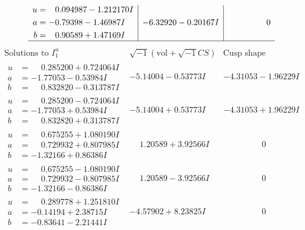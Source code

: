 \documentclass[1p]{elsarticle_modified}
\theoremstyle{definition}
\newcommand{\I}{\sqrt{-1}}
\begin{document}
$$\begin{array}{c|c|c}
\begin{aligned}
u &= \phantom{-}0.094987 - 1.212170 I \\
a &= -0.79398 - 1.46987 I \\
b &= \phantom{-}0.90589 + 1.47169 I\end{aligned}
 & -6.32920 - 0.20167 I & \phantom{-0.000000 } 0\\
 \hline 
 \end{array}$$\newpage$$\begin{array}{c|c|c}  
\text{Solutions to }I^u_{1}& \I (\text{vol} + \sqrt{-1}CS) & \text{Cusp shape}\\
 \hline 
\begin{aligned}
u &= \phantom{-}0.285200 + 0.724064 I \\
a &= -1.77053 - 0.53984 I \\
b &= \phantom{-}0.832820 - 0.313787 I\end{aligned}
 & -5.14004 - 0.53773 I & -4.31053 - 1.96229 I \\ \hline\begin{aligned}
u &= \phantom{-}0.285200 - 0.724064 I \\
a &= -1.77053 + 0.53984 I \\
b &= \phantom{-}0.832820 + 0.313787 I\end{aligned}
 & -5.14004 + 0.53773 I & -4.31053 + 1.96229 I \\ \hline\begin{aligned}
u &= \phantom{-}0.675255 + 1.080190 I \\
a &= \phantom{-}0.729932 + 0.807985 I \\
b &= -1.32166 + 0.86386 I\end{aligned}
 & \phantom{-}1.20589 + 3.92566 I & \phantom{-0.000000 } 0 \\ \hline\begin{aligned}
u &= \phantom{-}0.675255 - 1.080190 I \\
a &= \phantom{-}0.729932 - 0.807985 I \\
b &= -1.32166 - 0.86386 I\end{aligned}
 & \phantom{-}1.20589 - 3.92566 I & \phantom{-0.000000 } 0 \\ \hline\begin{aligned}
u &= \phantom{-}0.289778 + 1.251810 I \\
a &= -0.14194 + 2.38715 I \\
b &= -0.83641 - 2.21441 I\end{aligned}
 & -4.57902 + 8.23825 I & \phantom{-0.000000 } 0 \\ \hline\begin{aligned}

\end{aligned}
\end{array}$$
\end{document}
